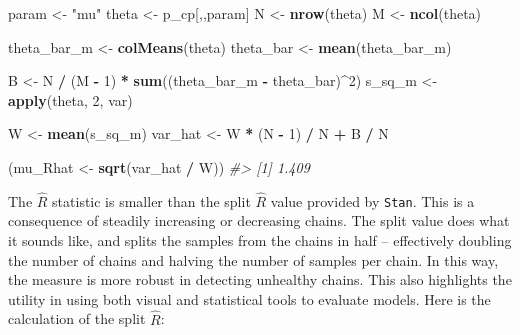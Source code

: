 \documentclass[11pt, oneside, openany]{scrbook}
\newenvironment{Shaded}{\begin{snugshade}}{\end{snugshade}}
\newcommand{\CommentTok}[1]{\textcolor[rgb]{0.56,0.35,0.01}{\textit{#1}}}
\newcommand{\DecValTok}[1]{\textcolor[rgb]{0.00,0.00,0.81}{#1}}
\newcommand{\KeywordTok}[1]{\textcolor[rgb]{0.13,0.29,0.53}{\textbf{#1}}}
\newcommand{\NormalTok}[1]{#1}
\newcommand{\OperatorTok}[1]{\textcolor[rgb]{0.81,0.36,0.00}{\textbf{#1}}}
\newcommand{\StringTok}[1]{\textcolor[rgb]{0.31,0.60,0.02}{#1}}
\begin{document}
\begin{Shaded}
\begin{Highlighting}[]
\NormalTok{param <-}\StringTok{ "mu"}
\NormalTok{theta <-}\StringTok{ }\NormalTok{p_cp[,,param]}
\NormalTok{N     <-}\StringTok{ }\KeywordTok{nrow}\NormalTok{(theta)}
\NormalTok{M     <-}\StringTok{ }\KeywordTok{ncol}\NormalTok{(theta)}

\NormalTok{theta_bar_m <-}\StringTok{ }\KeywordTok{colMeans}\NormalTok{(theta)}
\NormalTok{theta_bar   <-}\StringTok{ }\KeywordTok{mean}\NormalTok{(theta_bar_m)}

\NormalTok{B <-}\StringTok{ }\NormalTok{N }\OperatorTok{/}\StringTok{ }\NormalTok{(M }\OperatorTok{-}\StringTok{ }\DecValTok{1}\NormalTok{) }\OperatorTok{*}\StringTok{ }\KeywordTok{sum}\NormalTok{((theta_bar_m }\OperatorTok{-}\StringTok{ }\NormalTok{theta_bar)}\OperatorTok{^}\DecValTok{2}\NormalTok{)}
\NormalTok{s_sq_m <-}\StringTok{ }\KeywordTok{apply}\NormalTok{(theta, }\DecValTok{2}\NormalTok{, var)}

\NormalTok{W <-}\StringTok{ }\KeywordTok{mean}\NormalTok{(s_sq_m)}
\NormalTok{var_hat <-}\StringTok{ }\NormalTok{W }\OperatorTok{*}\StringTok{ }\NormalTok{(N }\OperatorTok{-}\StringTok{ }\DecValTok{1}\NormalTok{) }\OperatorTok{/}\StringTok{ }\NormalTok{N }\OperatorTok{+}\StringTok{ }\NormalTok{B }\OperatorTok{/}\StringTok{ }\NormalTok{N}

\NormalTok{(mu_Rhat <-}\StringTok{ }\KeywordTok{sqrt}\NormalTok{(var_hat }\OperatorTok{/}\StringTok{ }\NormalTok{W))}
\CommentTok{#> [1] 1.409}
\end{Highlighting}
\end{Shaded}

The \(\hat{R}\) statistic is smaller than the split \(\hat{R}\) value provided by \texttt{Stan}. This is a consequence of steadily increasing or decreasing chains. The split value does what it sounds like, and splits the samples from the chains in half -- effectively doubling the number of chains and halving the number of samples per chain. In this way, the measure is more robust in detecting unhealthy chains. This also highlights the utility in using both visual and statistical tools to evaluate models. Here is the calculation of the split \(\hat{R}\):
\end{document}
